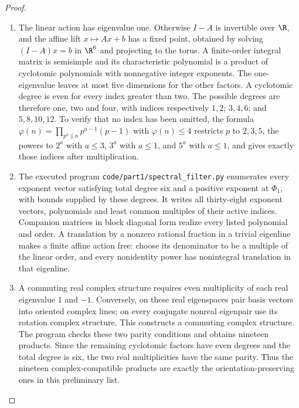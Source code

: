 \begin{proof}
\begin{enumerate}[label=\arabic*.]
\item The linear action has eigenvalue one. Otherwise $I-A$ is
invertible over $\R$, and the affine lift $x\mapsto Ax+b$
has a fixed point, obtained by solving $(I-A)x=b$ in $\R^6$
and projecting to the torus. A finite-order integral matrix is
semisimple and its characteristic polynomial is a product of
cyclotomic polynomials with nonnegative integer exponents.
The one-eigenvalue leaves at most five dimensions for the other
factors. A cyclotomic degree is even for every index greater
than two. The possible degrees are therefore one, two and four,
with indices respectively $1,2$; $3,4,6$; and $5,8,10,12$.
To verify that no index has been omitted, the formula
$\varphi(n)=\prod_{p^a\parallel n}p^{a-1}(p-1)$ with
$\varphi(n)\le4$ restricts $p$ to $2,3,5$, the powers to
$2^a$ with $a\le3$, $3^a$ with $a\le1$, and $5^a$ with
$a\le1$, and gives exactly those indices after multiplication.

\item The executed program \texttt{code/part1/spectral\_filter.py}
enumerates every exponent vector satisfying total degree six
and a positive exponent at $\Phi_1$, with bounds supplied by
these degrees. It writes all thirty-eight exponent vectors,
polynomials and least common multiples of their active indices.
Companion matrices in block diagonal form realize every listed
polynomial and order. A translation by a nonzero rational
fraction in a trivial eigenline makes a finite affine action
free: choose its denominator to be a multiple of the linear
order, and every nonidentity power has nonintegral translation
in that eigenline.

\item A commuting real complex structure requires even multiplicity
of each real eigenvalue $1$ and $-1$. Conversely, on these real
eigenspaces pair basis vectors into oriented complex lines;
on every conjugate nonreal eigenpair use its rotation complex
structure. This constructs a commuting complex structure.
The program checks these two parity conditions and obtains
nineteen products. Since the remaining cyclotomic factors have
even degrees and the total degree is six, the two real
multiplicities have the same parity. Thus the nineteen
complex-compatible products are exactly the orientation-preserving
ones in this preliminary list.

\end{enumerate}
\end{proof}



